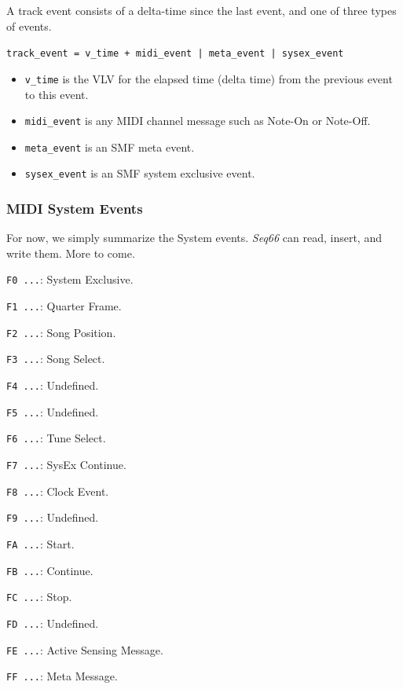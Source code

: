    A track event consists of a delta-time since the last event, and one of
   three types of events.
 
   \texttt{track\_event = v\_time + midi\_event | meta\_event | sysex\_event}
 
   \begin{itemize}
      \item \texttt{v\_time} is the VLV for the elapsed time
         (delta time) from the previous event to this event.
      \item \texttt{midi\_event} is any MIDI channel message such as Note-On
         or Note-Off.
      \item \texttt{meta\_event} is an SMF meta event.
      \item \texttt{sysex\_event} is an SMF system exclusive event.
   \end{itemize}

\subsubsection{MIDI System Events}
\label{subsubsec:midi_system_events}

   For now, we simply summarize the System events. \textsl{Seq66}
   can read, insert, and write them.  More to come.

   \begin{enumber}
      \item \texttt{F0 ...}: System Exclusive.
      \item \texttt{F1 ...}: Quarter Frame.
      \item \texttt{F2 ...}: Song Position.
      \item \texttt{F3 ...}: Song Select.
      \item \texttt{F4 ...}: Undefined.
      \item \texttt{F5 ...}: Undefined.
      \item \texttt{F6 ...}: Tune Select.
      \item \texttt{F7 ...}: SysEx Continue.
      \item \texttt{F8 ...}: Clock Event.
      \item \texttt{F9 ...}: Undefined.
      \item \texttt{FA ...}: Start.
      \item \texttt{FB ...}: Continue.
      \item \texttt{FC ...}: Stop.
      \item \texttt{FD ...}: Undefined.
      \item \texttt{FE ...}: Active Sensing Message.
      \item \texttt{FF ...}: Meta Message.
   \end{enumber}

